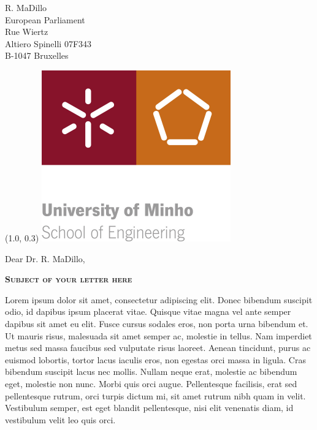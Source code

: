 \documentclass[a4paper,12pt]{letter}
\date{February 31, 2013}
\begin{document}
\begin{letter}{
	R. MaDillo\\
	European Parliament\\
	Rue Wiertz\\
	Altiero Spinelli 07F343\\
	B-1047 Bruxelles 
}

\begin{textblock}{10}(1.0, 0.3)
	\includegraphics{logo}
\end{textblock}

\opening{Dear Dr. R. MaDillo,}
{
\begin{center}
	\textbf{\textsc{Subject of your letter here}}\\[2em]
\end{center}
}

% 
%
%

	Lorem ipsum dolor sit amet, consectetur adipiscing elit. Donec bibendum 
	suscipit odio, id dapibus ipsum placerat vitae. Quisque vitae magna vel ante 
	semper dapibus sit amet eu elit. Fusce cursus sodales eros, non porta urna 
	bibendum et. Ut mauris risus, malesuada sit amet semper ac, molestie in 
	tellus. Nam imperdiet metus sed massa faucibus sed vulputate risus laoreet. 
	Aenean tincidunt, purus ac euismod lobortis, tortor lacus iaculis eros, non 
	egestas orci massa in ligula. Cras bibendum suscipit lacus nec mollis. Nullam 
	neque erat, molestie ac bibendum eget, molestie non nunc. Morbi quis orci 
	augue. Pellentesque facilisis, erat sed pellentesque rutrum, orci turpis 
	dictum mi, sit amet rutrum nibh quam in velit. Vestibulum semper, est eget 
	blandit pellentesque, nisi elit venenatis diam, id vestibulum velit leo quis 
	orci. 


\end{letter}
\end{document}
